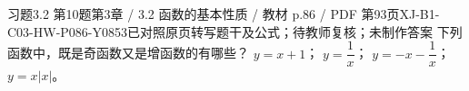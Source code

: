\par\noindent\begin{minipage}{\linewidth}
\begin{bankitem}{习题3.2 第10题}{第3章 / 3.2 函数的基本性质 / 教材 p.86 / PDF 第93页}{XJ-B1-C03-HW-P086-Y0853}{已对照原页转写题干及公式；待教师复核；未制作答案}
下列函数中，既是奇函数又是增函数的有哪些？
$y=x+1$；
$y=\dfrac1x$；
$y=-x-\dfrac1x$；
$y=x|x|$。
\end{bankitem}
\end{minipage}\par\medskip
